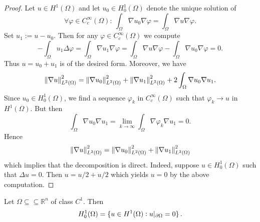 \begin{proof}
	Let $u \in H^1(\Omega)$ and let $u_0 \in H^1_0(\Omega)$ denote the unique solution of
	\begin{equation*}
		\forall \varphi \in C^\infty_c(\Omega): \> \int_\Omega \nabla u_0 \nabla \varphi = \int_\Omega \nabla u \nabla \varphi.
	\end{equation*}
	Set $u_1 := u - u_0$. Then for any $\varphi \in C^\infty_c(\Omega)$ we compute
	\begin{equation*}
		-\int_\Omega u_1 \Delta \varphi = \int_\Omega \nabla u_1 \nabla \varphi = \int_\Omega \nabla u \nabla \varphi - \int_\Omega \nabla u_0 \nabla \varphi = 0.
	\end{equation*}
	Thus $u = u_0 + u_1$ is of the desired form. Moreover, we have
	\begin{equation*}
		\norm[0]{\nabla u}_{L^2(\Omega)}^2 = \norm[0]{\nabla u_0}^2_{L^2(\Omega)} + \norm[0]{\nabla u_1}^2_{L^2(\Omega)} + 2 \int_\Omega \nabla u_0 \nabla u_1.
	\end{equation*}
	Since $u_0 \in H^1_0(\Omega)$, we find a sequence $\varphi_k$ in $C^\infty_c(\Omega)$ such that $\varphi_k \to u$ in $H^1(\Omega)$. But then
	\begin{equation*}
		\int_\Omega \nabla u_0 \nabla u_1 = \lim_{k \to \infty} \int_\Omega \nabla \varphi_k \nabla u_1 = 0.
	\end{equation*}
	Hence
	\begin{equation*}
		\norm[0]{\nabla u}_{L^2(\Omega)}^2 = \norm[0]{\nabla u_0}^2_{L^2(\Omega)} + \norm[0]{\nabla u_1}^2_{L^2(\Omega)}
	\end{equation*}
	\noindent which implies that the decomposition is direct. Indeed, suppose $u \in H^1_0(\Omega)$ such that $\Delta u = 0$. Then $u = u/2 + u/2$ which yields $u = 0$ by the above computation.
\end{proof}

\begin{corollary}
	Let $\Omega \subseteq \subseteq \mathbb{R}^n$ of class $C^1$. Then
	\begin{equation*}
		H^1_0(\Omega) = \cbr[0]{u \in H^1(\Omega) : u\vert_{\partial \Omega} = 0}.
	\end{equation*}
\end{corollary}

